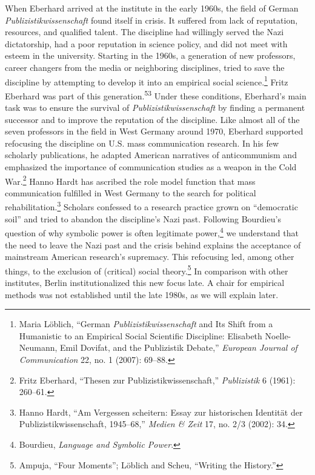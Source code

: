 \documentclass{tufte-handout}
\begin{document}
When Eberhard arrived at the institute in the early 1960s, the field of
German \emph{Publizistikwissenschaft} found itself in crisis. It
suffered from lack of reputation, resources, and qualified talent. The
discipline had willingly served the Nazi dictatorship, had a poor
reputation in science policy, and did not meet with esteem in the
university. Starting in the 1960s, a generation of new professors,
career changers from the media or neighboring disciplines, tried to save
the discipline by attempting to develop it into an empirical social
science.\footnote{Maria Löblich, ``German \emph{Publizistikwissenschaft}
  and Its Shift from a Humanistic to an Empirical Social Scientific
  Discipline: Elisabeth Noelle-Neumann, Emil Dovifat, and the
  Publizistik Debate,'' \emph{European Journal of Communication} 22, no.
  1 (2007): 69--88.} Fritz Eberhard was part of this
generation.\textsuperscript{53}
\newpage
Under these conditions, Eberhard's main task was to ensure the survival
of \emph{Publizistikwissenschaft} by finding a permanent successor and
to improve the reputation of the discipline. Like almost all of the
seven professors in the field in West Germany around 1970, Eberhard
supported refocusing the discipline on U.S. mass communication research.
In his few scholarly publications, he adapted American narratives of
anticommunism and emphasized the importance of communication studies as
a weapon in the Cold War.\footnote{Fritz Eberhard, ``Thesen zur
  Publizistikwissenschaft,'' \emph{Publizistik} 6 (1961): 260--61.}
Hanno Hardt has ascribed the role model function that mass communication
fulfilled in West Germany to the search for political
rehabilitation.\footnote{Hanno Hardt, ``Am Vergessen scheitern: Essay
  zur historischen Identität der Publizistikwissenschaft, 1945--68,''
  \emph{Medien \& Zeit} 17, no. 2/3 (2002): 34.} Scholars confessed to a
research practice grown on ``democratic soil'' and tried to abandon the
discipline's Nazi past. Following Bourdieu's question of why symbolic
power is often legitimate power,\footnote{Bourdieu, \emph{Language and
  Symbolic Power}.} we understand that the need to leave the Nazi past
and the crisis behind explains the acceptance of mainstream American
research's supremacy. This refocusing led, among other things, to the
exclusion of (critical) social theory.\footnote{Ampuja, ``Four
  Moments''; Löblich and Scheu, ``Writing the History.''} In comparison
with other institutes, Berlin institutionalized this new focus late. A
chair for empirical methods was not established until the late 1980s, as
we will explain later.
\end{document}
